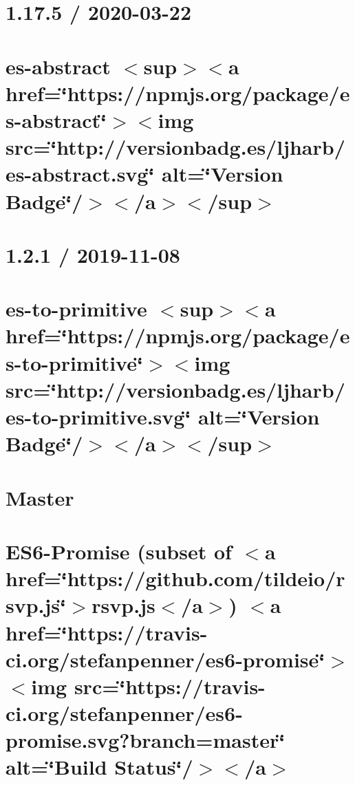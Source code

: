 \let\mypdfximage\pdfximage\def\pdfximage{\immediate\mypdfximage}\documentclass[twoside]{book}
\newcommand{\+}{\discretionary{\mbox{\scriptsize$\hookleftarrow$}}{}{}}
\begin{document}
\chapter{1.17.5 / 2020-\/03-\/22}
\label{md_heap-visualizer_node_modules_es-abstract__c_h_a_n_g_e_l_o_g}

\chapter{es-\/abstract $<$sup$>$$<$a href=\char`\"{}https\+://npmjs.\+org/package/es-\/abstract\char`\"{}$>$$<$img src=\char`\"{}http\+://versionbadg.\+es/ljharb/es-\/abstract.\+svg\char`\"{} alt=\char`\"{}\+Version Badge\char`\"{}/$>$$<$/a$>$$<$/sup$>$}
\label{md_heap-visualizer_node_modules_es-abstract__r_e_a_d_m_e}

\chapter{1.2.1 / 2019-\/11-\/08}
\label{md_heap-visualizer_node_modules_es-to-primitive__c_h_a_n_g_e_l_o_g}

\chapter{es-\/to-\/primitive $<$sup$>$$<$a href=\char`\"{}https\+://npmjs.\+org/package/es-\/to-\/primitive\char`\"{}$>$$<$img src=\char`\"{}http\+://versionbadg.\+es/ljharb/es-\/to-\/primitive.\+svg\char`\"{} alt=\char`\"{}\+Version Badge\char`\"{}/$>$$<$/a$>$$<$/sup$>$}
\label{md_heap-visualizer_node_modules_es-to-primitive__r_e_a_d_m_e}

\chapter{Master}
\label{md_heap-visualizer_node_modules_es6-promise__c_h_a_n_g_e_l_o_g}

\chapter{E\+S6-\/\+Promise (subset of $<$a href=\char`\"{}https\+://github.\+com/tildeio/rsvp.\+js\char`\"{}$>$rsvp.\+js$<$/a$>$) $<$a href=\char`\"{}https\+://travis-\/ci.\+org/stefanpenner/es6-\/promise\char`\"{}$>$$<$img src=\char`\"{}https\+://travis-\/ci.\+org/stefanpenner/es6-\/promise.\+svg?branch=master\char`\"{} alt=\char`\"{}\+Build Status\char`\"{}/$>$$<$/a$>$}
\label{md_heap-visualizer_node_modules_es6-promise__r_e_a_d_m_e}

\end{document}
